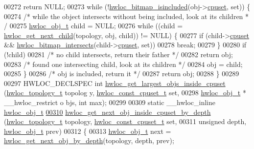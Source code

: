 \begin{DoxyCode}
00272     \textcolor{keywordflow}{return} NULL;
00273   \textcolor{keywordflow}{while} (!\hyperlink{a00065_gaae29e14a926c198e8f91e6e4790621e7}{hwloc_bitmap_isincluded}(obj->\hyperlink{a00016_a67925e0f2c47f50408fbdb9bddd0790f}{cpuset}, \textcolor{keyword}{set})) \{
00274     \textcolor{comment}{/* while the object intersects without being included, look at its children *
      /}
00275     \hyperlink{a00016}{hwloc_obj_t} child = NULL;
00276     \textcolor{keywordflow}{while} ((child = \hyperlink{a00053_gae5ef1af636849f77714e1584ba78cf9c}{hwloc_get_next_child}(topology, obj, child)) != NULL) \{
00277       \textcolor{keywordflow}{if} (child->\hyperlink{a00016_a67925e0f2c47f50408fbdb9bddd0790f}{cpuset} && \hyperlink{a00065_ga575c27953709a8cb9a047aae65157526}{hwloc_bitmap_intersects}(child->\hyperlink{a00016_a67925e0f2c47f50408fbdb9bddd0790f}{cpuset}, \textcolor{keyword}{set}))
00278         \textcolor{keywordflow}{break};
00279     \}
00280     \textcolor{keywordflow}{if} (!child)
00281       \textcolor{comment}{/* no child intersects, return their father */}
00282       \textcolor{keywordflow}{return} obj;
00283     \textcolor{comment}{/* found one intersecting child, look at its children */}
00284     obj = child;
00285   \}
00286   \textcolor{comment}{/* obj is included, return it */}
00287   \textcolor{keywordflow}{return} obj;
00288 \}
00289 
00297 HWLOC\_DECLSPEC \textcolor{keywordtype}{int} \hyperlink{a00054_gaab04c89623662e63a48ed2cd48eb601c}{hwloc_get_largest_objs_inside_cpuset} (\hyperlink{a00039_ga9d1e76ee15a7dee158b786c30b6a6e38}{hwloc_topology_t} topolog
      y, \hyperlink{a00040_ga1f784433e9b606261f62d1134f6a3b25}{hwloc_const_cpuset_t} \textcolor{keyword}{set},
00298                                                  \hyperlink{a00016}{hwloc_obj_t} * \_\_hwloc\_restrict o
      bjs, \textcolor{keywordtype}{int} max);
00299 
00309 \textcolor{keyword}{static} \_\_hwloc\_inline \hyperlink{a00016}{hwloc_obj_t}
\hypertarget{a00031_source_l00310}{}\hyperlink{a00054_ga8af256c2572f16520f95440b884c1bd6}{00310} \hyperlink{a00054_ga8af256c2572f16520f95440b884c1bd6}{hwloc_get_next_obj_inside_cpuset_by_depth} (\hyperlink{a00039_ga9d1e76ee15a7dee158b786c30b6a6e38}{hwloc_topology_t} topology, 
      \hyperlink{a00040_ga1f784433e9b606261f62d1134f6a3b25}{hwloc_const_cpuset_t} \textcolor{keyword}{set},
00311                                            \textcolor{keywordtype}{unsigned} depth, \hyperlink{a00016}{hwloc_obj_t} prev)
00312 \{
00313   \hyperlink{a00016}{hwloc_obj_t} next = \hyperlink{a00053_gab7c1dce3f42ece5bfa621e87cf332418}{hwloc_get_next_obj_by_depth}(topology, depth, prev);

\end{DoxyCode}
